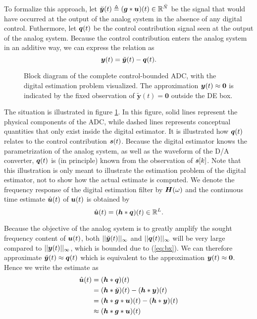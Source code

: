 To formalize this approach, let $\breve{\bm{y}}(t) \triangleq (\bm{g} * \bm{u})(t) \in \mathbb{R}^{\tilde{N}}$ be the signal that would have occurred at the output of the analog system in the absence of any digital control. Futhermore, let $\bm{q}(t)$ be the control contribution signal seen at the output of the analog system. Because the control contribution enters the analog system in an additive way, we can express the relation as
\begin{equation}
    \label{eq:actual_observation}
    \bm{y}(t) = \breve{\bm{y}}(t) -\bm{q}(t).
\end{equation}
\begin{sidewaysfigure}
    \centering
    
    \caption{Block diagram of the complete control-bounded ADC, with the digital estimation problem visualized. The approximation $\bm{y}(t) \approx \bm{0}$ is indicated by the fixed observation of $\tilde{\bm{y}}(t) = \bm{0}$ outside the DE box.}
    \label{fig:de_problem}
\end{sidewaysfigure}

The situation is illustrated in figure \ref{fig:de_problem}. In this figure, solid lines represent the physical components of the ADC, while dashed lines represents conceptual quantities that only exist inside the digital estimator. It is illustrated how $\bm{q}(t)$ relates to the control contribution $\bm{s}(t)$. Because the digital estimator knows the parametrization of the analog system, as well as the waveform of the D/A converter, $\bm{q}(t)$ is (in principle) known from the observation of $\bm{s}[k]$. Note that this illustration is only meant to illustrate the estimation problem of the digital estimator, not to show how the actual estimate is computed. We denote the frequency response of the digital estimation filter by $\bm{H}(\omega)$ and the continuous time estimate $\hat{\bm{u}}(t)$ of $\bm{u}(t)$ is obtained by
\begin{equation}
    \label{eq:uhat_conv_h_q}
    \hat{\bm{u}}(t) = (\bm{h} * \bm{q})(t) \in \mathbb{R}^{L}.
\end{equation}

Because the objective of the analog system is to greatly amplify the sought frequency content of $\bm{u}(t)$, both $||\breve{\bm{y}}(t)||_{\infty}$ and $||\bm{q}(t)||_{\infty}$ will be very large compared to $||\bm{y}(t)||_{\infty}$, which is bounded due to (\ref{eq:bx}). We can therefore approximate $\breve{\bm{y}}(t) \approx \bm{q}(t)$ which is equivalent to the approximation $\bm{y}(t) \approx \bm{0}$. Hence we write the estimate as
\begin{align}
    \hat{\bm{u}}(t) &= (\bm{h} * \bm{q})(t) \\
            &= (\bm{h} * \breve{\bm{y}})(t) - (\bm{h} * \bm{y})(t) \label{eq:uhat_q_err}\\
            &= (\bm{h} * \bm{g} * \bm{u})(t) - (\bm{h} * \bm{y})(t) \label{eq:uhat_q_err2}\\
            &\approx (\bm{h} * \bm{g} * \bm{u})(t) \label{eq:uhat_approx}
\end{align}

